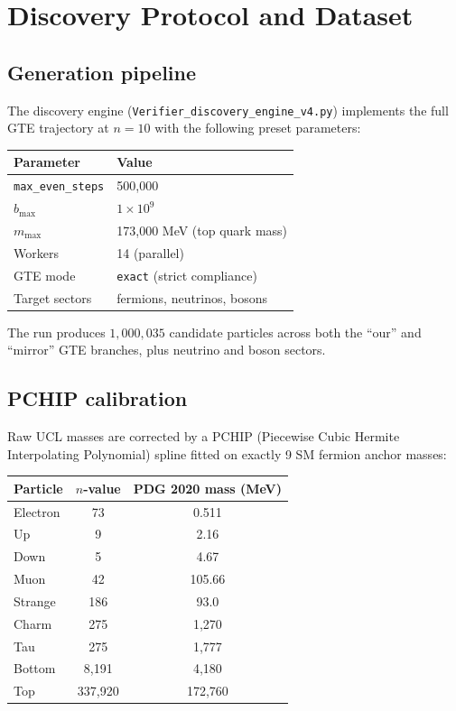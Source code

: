 \documentclass[12pt]{article}
\numberwithin{equation}{section}
\begin{document}
\section{Discovery Protocol and Dataset}
\label{sec:discovery}

\subsection{Generation pipeline}

The discovery engine (\texttt{Verifier\_discovery\_engine\_v4.py}) implements the full GTE trajectory at $n{=}10$ with the following preset parameters:

\begin{center}
\begin{tabular}{ll}
\toprule
Parameter & Value \\
\midrule
\texttt{max\_even\_steps} & 500,000 \\
$b_{\max}$ & $1 \times 10^9$ \\
$m_{\max}$ & 173,000 MeV (top quark mass) \\
Workers & 14 (parallel) \\
GTE mode & \texttt{exact} (strict compliance) \\
Target sectors & fermions, neutrinos, bosons \\
\bottomrule
\end{tabular}
\end{center}

The run produces $1{,}000{,}035$ candidate particles across both the ``our'' and ``mirror'' GTE branches, plus neutrino and boson sectors.

\subsection{PCHIP calibration}
\label{sec:calibration}

Raw UCL masses are corrected by a PCHIP (Piecewise Cubic Hermite Interpolating Polynomial) spline fitted on exactly 9 SM fermion anchor masses:

\begin{center}
\begin{tabular}{lcc}
\toprule
Particle & $n$-value & PDG 2020 mass (MeV) \\
\midrule
Electron & 73 & 0.511 \\
Up & 9 & 2.16 \\
Down & 5 & 4.67 \\
Muon & 42 & 105.66 \\
Strange & 186 & 93.0 \\
Charm & 275 & 1,270 \\
Tau & 275 & 1,777 \\
Bottom & 8,191 & 4,180 \\
Top & 337,920 & 172,760 \\
\bottomrule
\end{tabular}
\end{center}
\end{document}
